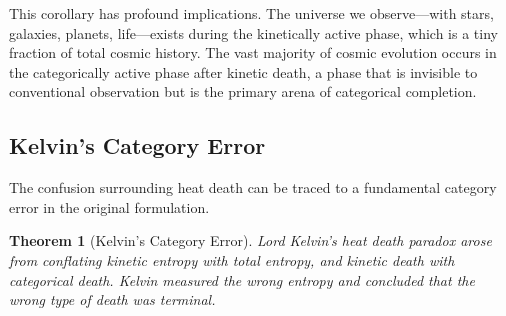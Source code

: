\documentclass[12pt,a4paper]{article}
\newtheorem{theorem}{Theorem}[section]
\theoremstyle{definition}
\theoremstyle{remark}
\begin{document}
This corollary has profound implications. The universe we observe—with stars, galaxies, planets, life—exists during the kinetically active phase, which is a tiny fraction of total cosmic history. The vast majority of cosmic evolution occurs in the categorically active phase after kinetic death, a phase that is invisible to conventional observation but is the primary arena of categorical completion.

\subsection{Kelvin's Category Error}

The confusion surrounding heat death can be traced to a fundamental category error in the original formulation.

\begin{theorem}[Kelvin's Category Error]
\label{thm:kelvin_error}
Lord Kelvin's heat death paradox arose from conflating kinetic entropy with total entropy, and kinetic death with categorical death. Kelvin measured the wrong entropy and concluded that the wrong type of death was terminal.
\end{theorem}
\end{document}
